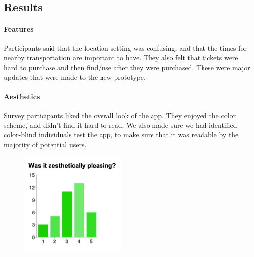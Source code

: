 \subsection{Results}

\paragraph{Features}
Participants said that the location setting was confusing, and that the times for nearby transportation are important to have. They also felt that tickets were hard to purchase and then find/use after they were purchased. These were major updates that were made to the new prototype.
\clearpage
\paragraph{Aesthetics}
Survey participants liked the overall look of the app. They enjoyed the color scheme, and didn’t find it hard to read. We also made sure we had identified color-blind individuals test the app, to make sure that it was readable by the majority of potential users.
\begin{figure}[!htbp]
\centering
\includegraphics[scale=1]{Prototype/results.png}
\end{figure}

